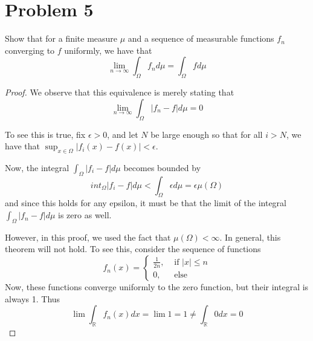 \documentclass[fontsize=11pt]{scrartcl} %
\numberwithin{equation}{section} %
\numberwithin{figure}{section} %
\numberwithin{table}{section} %
\newcommand{\R}{\mathbb{R}}
\begin{document}
\section*{Problem 5}
Show that for a finite measure $\mu$ and a sequence of measurable functions $f_n$ converging
to $f$ uniformly, we have that
\[
\lim_{n\to\infty}\int_{\Omega}f_nd\mu = \int_{\Omega}fd\mu
\]

\begin{proof}
We observe that this equivalence is merely stating that
\[
\lim_{n\to\infty}\int_{\Omega} |f_n - f|d\mu = 0
\]

To see this is true, fix $\epsilon >0$, and let $N$ be large enough so that
for all $i>N$, we have that $\sup_{x\in\Omega}|f_i(x)-f(x)|<\epsilon$.

Now, the integral $\int_{\Omega}|f_i - f|d\mu$ becomes bounded by
\[
int_{\Omega}|f_i - f|d\mu < \int_{\Omega} \epsilon d\mu = \epsilon \mu(\Omega)
\]
and since this holds for any epsilon, it must be that
the limit of the integral $\int_{\Omega}|f_n-f|d\mu$ is zero as well.

However, in this proof, we used the fact that $\mu(\Omega) < \infty$. In general,
this theorem will not hold. To see this, consider the sequence of functions
\[
f_n(x) =
\begin{cases}
\frac{1}{2n}, &\textrm{ if } |x|\leq n\\
0, &\textrm{ else}
\end{cases}
\]
Now, these functions converge uniformly to the zero function, but their integral is always
1. Thus
\[
\lim\int_{\R} f_n(x) dx = \lim 1 = 1 \neq \int_{\R} 0 dx = 0 
\]
\end{proof}
\end{document}
